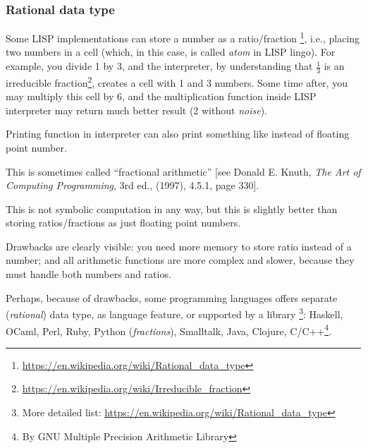 \subsubsection{Rational data type}

Some LISP implementations can store a number as a ratio/fraction
\footnote{\url{https://en.wikipedia.org/wiki/Rational_data_type}}, i.e., placing two numbers in a cell (which, in this case, is called \textit{atom} in LISP lingo).
For example, you divide 1 by 3, and the interpreter, by understanding that $\frac{1}{3}$ is 
an irreducible fraction\footnote{\url{https://en.wikipedia.org/wiki/Irreducible_fraction}}, creates a cell with 1 and 3 numbers.
Some time after, you may multiply this cell by 6, and the multiplication function inside LISP interpreter may return much better result (2 without \textit{noise}).

Printing function in interpreter can also print something like  instead of floating point number.

This is sometimes called ``fractional arithmetic'' [see Donald E. Knuth, \textit{The Art of Computing Programming}, 3rd ed., (1997), 4.5.1, page 330].

This is not symbolic computation in any way, but this is slightly better than storing ratios/fractions as just floating point numbers.

Drawbacks are clearly visible: you need more memory to store ratio instead of a number;
and all arithmetic functions are more complex and slower, because they must handle both numbers and ratios.

Perhaps, because of drawbacks, some programming languages offers separate (\textit{rational}) data type, as language feature, or supported by a library
\footnote{More detailed list: \url{https://en.wikipedia.org/wiki/Rational_data_type}}:
Haskell, OCaml, Perl, Ruby, Python (\textit{fractions}), Smalltalk, Java, Clojure,
C/C++\footnote{By GNU Multiple Precision Arithmetic Library}.

